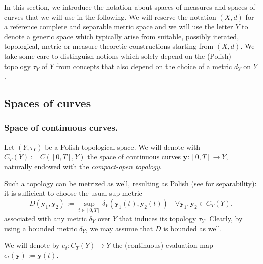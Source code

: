 \documentclass[10pt,leqno]{amsart}
\numberwithin{equation}{section}
\newcommand{\PP}{\mathcal{P}}
\begin{document}
\vspace{1cm}
\noindent
In this section, we introduce the notation about spaces of measures and spaces of curves that we will use in the following. 
We will reserve the notation
$(X,d)$ for a reference complete and separable metric space and we will use the letter $Y$ 
to denote a generic space which typically arise from suitable, possibly iterated, topological, metric or
measure-theoretic constructions
starting from $(X,d)$. 
We take some care to distinguish 
notions which solely depend on the 
(Polish) topology $\tau_Y$ of $Y$ from concepts
that also depend on the choice of a metric
$d_Y$ on $Y$.


\subsection{Spaces of curves}


\subsubsection{Space of continuous curves.}\label{subsub space of cont curves}
Let $(Y,\tau_Y)$ be a Polish topological space. We will denote with $C_T(Y):= C([0,T],Y)$ the space of continuous curves $\boldsymbol{y}:[0,T]\to Y$, naturally endowed with the \textit{compact-open topology}.


Such a topology can be metrized as well, resulting as Polish (see \cite[Theorem 2.4.3]{srivastava2008course} for separability): 
it is sufficient to 
choose the 
usual sup-metric 
\begin{equation}
    D(\boldsymbol{y}_1, \boldsymbol{y}_2):= \sup_{t\in [0,T]} \delta_Y(\boldsymbol{y}_1(t),\boldsymbol{y}_2(t)) \quad \forall \boldsymbol{y}_1,\boldsymbol{y}_2 \in  C_T(Y).
\end{equation}
associated with
any metric $\delta_Y$ over $Y$ that induces its topology $\tau_Y$. Clearly, by 
using a bounded metric $\delta_Y$,
we may assume that $D$ is bounded as well.

We will denote by $e_t:C_T(Y)\to Y$
the (continuous) evaluation map
$e_t(\boldsymbol{y}):=\boldsymbol{y}(t).$
\end{document}
